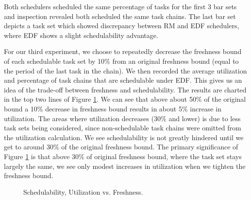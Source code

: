 Both schedulers scheduled the same percentage of tasks for the first 3 bar sets and inspection revealed both scheduled the same task chains. The last bar set depicts a task set which showed discrepancy between RM and EDF schedulers, where EDF shows a slight schedulability advantage.

For our third experiment, we choose to repeatedly decrease the freshness bound of each schedulable task set by 10\% from an original freshness bound (equal to the period of the last task in the chain). We then recorded the average utilization and percentage of task chains that are schedulable under EDF. This gives us an idea of the trade-off between freshness and schedulability. The results are charted in the top two lines of Figure \ref{fig:FreshnessChange}. We can see that above about 50\% of the original bound a 10\% decrease in freshness bound results in about 5\% increase in utilization. The areas where utilization decreases (30\% and lower) is due to less task sets being considered, since non-schedulable task chains were omitted from the utilization calculation. We see schedulability is not greatly hindered until we get to around 30\% of the original freshness bound. The primary significance of Figure \ref{fig:FreshnessChange} is that above 30\% of original freshness bound, where the task set stays largely the same, we see only modest increases in utilization when we tighten the freshness bound.

\begin{figure}[h]
\centering
{}
\caption{Schedulability, Utilization vs. Freshness.}
\label{fig:FreshnessChange}
\end{figure}


